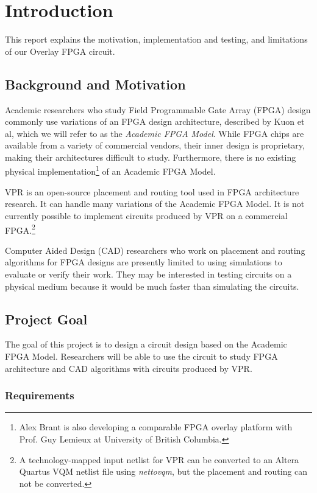 \section{Introduction}

This report explains the motivation, implementation and testing, and limitations of our Overlay FPGA circuit.


\subsection{Background and Motivation}

Academic researchers who study Field Programmable Gate Array (FPGA) design commonly use variations of an FPGA design architecture, described by Kuon et al\cite{fpga}, which we will refer to as the \emph{Academic FPGA Model}.
While FPGA chips are available from a variety of commercial vendors, their inner design is proprietary, making their architectures difficult to study.
Furthermore, there is no existing physical implementation\footnote{Alex Brant is also developing a comparable FPGA overlay platform with Prof. Guy Lemieux at University of British Columbia.} of an Academic FPGA Model.

VPR\cite{vpr} is an open-source placement and routing tool used in FPGA architecture research.
It can handle many variations of the Academic FPGA Model.
It is not currently possible to implement circuits produced by VPR on a commercial FPGA.\footnote{A technology-mapped input netlist for VPR can be converted to an Altera Quartus VQM netlist file using \emph{nettovqm}\cite{nettovqm}, but the placement and routing can not be converted.}

Computer Aided Design (CAD) researchers who work on placement and routing algorithms for FPGA designs are presently limited to using simulations to evaluate or verify their work.
They may be interested in testing circuits on a physical medium because it would be much faster than simulating the circuits.



\subsection{Project Goal}

The goal of this project is to design a circuit design based on the Academic FPGA Model.
Researchers will be able to use the circuit to study FPGA architecture and CAD algorithms with circuits produced by VPR.


\subsubsection{Requirements}

